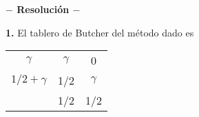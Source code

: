 \documentclass[11pt]{report}
\begin{document}




\begin{center}

	\textbf{$-$ Resolución $-$}

\end{center}


\textbf{1.} El tablero de Butcher del método dado es

\begin{center}
  \setlength\extrarowheight{2.5pt}
  \begin{tabular}{c|cc}
      $\gamma$ & $\gamma$ & 0 \\
      $1/2+\gamma$ & 1/2  & $\gamma$ \\ \hline
      & 1/2 & 1/2
  \end{tabular}
  \end{center}
\end{document}
